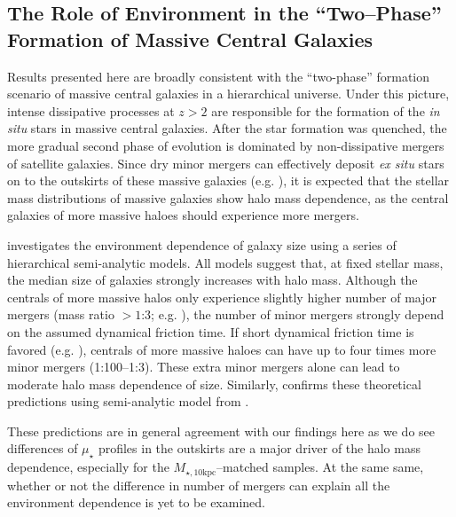 \documentclass[a4paper,fleqn,usenatbib]{mnras}
\def\minn{{$M_{\star,10\mathrm{kpc}}$}}
\def\mden{{$\mu_{\star}$}}
\begin{document}
\subsection{The Role of Environment in the ``Two--Phase'' Formation of 
            Massive Central Galaxies}
            
    Results presented here are broadly consistent with the ``two-phase'' formation
    scenario of massive central galaxies in a hierarchical universe. 
    Under this picture, intense dissipative processes at $z > 2$ are responsible for 
    the formation of the \textit{in situ} stars in massive central galaxies. 
    After the star formation was quenched, the more gradual second phase of evolution
    is dominated by non-dissipative mergers of satellite galaxies. 
    Since dry minor mergers can effectively deposit \textit{ex situ} stars on to the 
    outskirts of these massive galaxies (e.g. \citealt{Oogi2013, Bedorf2013}), 
    it is expected that the stellar mass distributions of massive galaxies 
    show halo mass dependence, as the central galaxies of more massive haloes should
    experience more mergers. 
    
    \citet{Shankar2014} investigates the environment dependence of galaxy size using 
    a series of hierarchical semi-analytic models. 
    All models suggest that, at fixed stellar mass, the median size of galaxies 
    strongly increases with halo mass. 
    Although the centrals of more massive halos only experience slightly higher 
    number of major mergers (mass ratio $>1$:3; e.g. \citealt{Hirschmann2013}), 
    the number of minor mergers strongly depend on the assumed dynamical friction time. 
    If short dynamical friction time is favored (e.g. \citealt{Newman2012}), 
    centrals of more massive haloes can have up to four times more minor mergers 
    (1:100--1:3). 
    These extra minor mergers alone can lead to moderate halo mass dependence of 
    size. 
    Similarly, \citet{Yoon2017} confirms these theoretical predictions using 
    semi-analytic model from \citet{Guo2011}. 
    
    These predictions are in general agreement with our findings here as we do see 
    differences of \mden{} profiles in the outskirts are a major driver of the 
    halo mass dependence, especially for the \minn{}--matched samples. 
    At the same same, whether or not the difference in number of mergers can explain 
    all the environment dependence is yet to be examined. 
    
\end{document}
